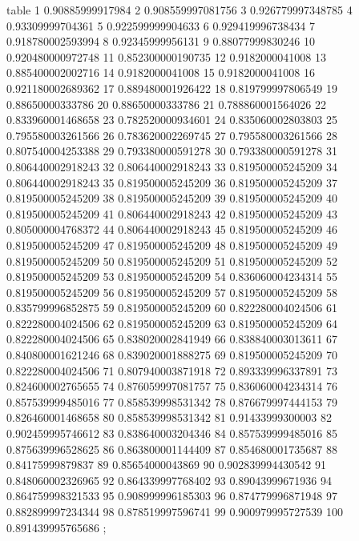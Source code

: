 table {%
	1 0.90885999917984
	2 0.908559997081756
	3 0.926779997348785
	4 0.93309999704361
	5 0.922599999904633
	6 0.929419996738434
	7 0.918780002593994
	8 0.92345999956131
	9 0.88077999830246
	10 0.920480000972748
	11 0.852300000190735
	12 0.9182000041008
	13 0.885400002002716
	14 0.9182000041008
	15 0.9182000041008
	16 0.921180002689362
	17 0.889480001926422
	18 0.819799997806549
	19 0.88650000333786
	20 0.88650000333786
	21 0.788860001564026
	22 0.833960001468658
	23 0.782520000934601
	24 0.835060002803803
	25 0.795580003261566
	26 0.783620002269745
	27 0.795580003261566
	28 0.807540004253388
	29 0.793380000591278
	30 0.793380000591278
	31 0.806440002918243
	32 0.806440002918243
	33 0.819500005245209
	34 0.806440002918243
	35 0.819500005245209
	36 0.819500005245209
	37 0.819500005245209
	38 0.819500005245209
	39 0.819500005245209
	40 0.819500005245209
	41 0.806440002918243
	42 0.819500005245209
	43 0.805000004768372
	44 0.806440002918243
	45 0.819500005245209
	46 0.819500005245209
	47 0.819500005245209
	48 0.819500005245209
	49 0.819500005245209
	50 0.819500005245209
	51 0.819500005245209
	52 0.819500005245209
	53 0.819500005245209
	54 0.836060004234314
	55 0.819500005245209
	56 0.819500005245209
	57 0.819500005245209
	58 0.835799996852875
	59 0.819500005245209
	60 0.822280004024506
	61 0.822280004024506
	62 0.819500005245209
	63 0.819500005245209
	64 0.822280004024506
	65 0.838020002841949
	66 0.838840003013611
	67 0.840800001621246
	68 0.839020001888275
	69 0.819500005245209
	70 0.822280004024506
	71 0.807940003871918
	72 0.893339996337891
	73 0.824600002765655
	74 0.876059997081757
	75 0.836060004234314
	76 0.857539999485016
	77 0.858539998531342
	78 0.876679997444153
	79 0.826460001468658
	80 0.858539998531342
	81 0.91433999300003
	82 0.902459995746612
	83 0.838640003204346
	84 0.857539999485016
	85 0.875639996528625
	86 0.863800001144409
	87 0.854680001735687
	88 0.84175999879837
	89 0.85654000043869
	90 0.902839994430542
	91 0.848060002326965
	92 0.864339997768402
	93 0.89043999671936
	94 0.864759998321533
	95 0.908999996185303
	96 0.874779996871948
	97 0.882899997234344
	98 0.878519997596741
	99 0.900979995727539
	100 0.891439995765686
};
